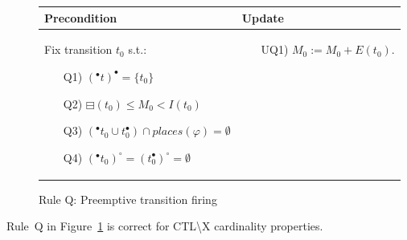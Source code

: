\begin{figure}[h!]
    \begin{adjustbox}{center}
        \begin{tabular}{|p{65mm}|p{45mm}|} \hline
        Precondition & Update \\ \hline
        Fix transition $t_0$ s.t.:
        \begin{itemize}[leftmargin=10mm]
            \item[Q1)] $({}^\bullet t)^\bullet = \{t_0\}$
            \item[Q2)] $\boxminus(t_0) \leq M_0 < I(t_0)$
            \item[Q3)] $({}^\bullet t_0 \cup t_0^\bullet) \cap
            places(\varphi) = \emptyset$
            \item[Q4)] $({}^\bullet t_0)^\circ = (t_0^\bullet)^\circ = \emptyset$
        \end{itemize}
        &
        \begin{itemize}[leftmargin=10mm]
            \item[UQ1)] $M_0:=M_0 + E(t_0)$.
        \end{itemize} \\ \hline
        \end{tabular}
    \end{adjustbox}
    \caption{Rule Q: Preemptive transition firing}
    \label{fig:rule_q}
\end{figure}

\begin{theorem}
    Rule~Q in Figure~\ref{fig:rule_q} is correct for CTL\textbackslash X cardinality properties.
\end{theorem}

